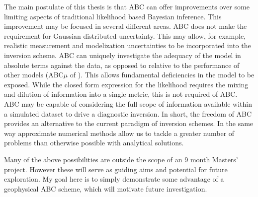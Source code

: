 The main postulate of this thesis is that ABC can offer improvements over some limiting aspects of traditional likelihood based Bayesian inference. This improvement may be focused in several different areas. ABC does not make the requirement for Gaussian distributed uncertainty. This may allow, for example, realistic measurement and modelization uncertainties to be incorporated into the inversion scheme. ABC can uniquely investigate the adequacy of the model in absolute terms against the data, as opposed to relative to the performance of other models (ABC$\mu$ of \citet{Ratmann2009}). This allows fundamental deficiencies in the model to be exposed. While the closed form expression for the likelihood requires the mixing and dilution of information into a single metric, this is not required of ABC. ABC may be capable of considering the full scope of information available within a simulated dataset to drive a diagnostic inversion. In short, the freedom of ABC provides an alternative to the current paradigm of inversion schemes. In the same way approximate numerical methods allow us to tackle a greater number of problems than otherwise possible with analytical solutions. \par

Many of the above possibilities are outside the scope of an 9 month Masters' project. However these will serve as guiding aims and potential for future exploration. My goal here is to simply demonstrate some advantage of a geophysical ABC scheme, which will motivate future investigation.